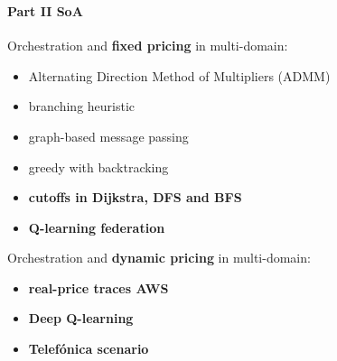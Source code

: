 \documentclass[aspectratio=169]{beamer}
\begin{document}
\begin{frame}
    \frametitle{\secname}
    \framesubtitle{Part II SoA}



    Orchestration and \textbf{fixed pricing} in multi-domain:
    \begin{itemize}
        \item Alternating Direction Method of Multipliers (ADMM)~\cite{ad3Distributed}
        \item branching heuristic~\cite{consolidation}
        \item graph-based message passing~\cite{vertex-centric}
        \item greedy with backtracking~\cite{balazsEmbedding}
        \item \textbf{\color{red}cutoffs in Dijkstra, DFS and BFS~\cite{multi-domain-msc}}
        \item \textbf{\color{red}Q-learning federation~\cite{icc}}
    \end{itemize}
    Orchestration and \textbf{\color{red}dynamic pricing} in multi-domain:
    \begin{itemize}
        \item \textbf{\color{red}real-price traces AWS}
        \item \textbf{\color{red}Deep Q-learning}
        \item \textbf{\color{red}Telefónica scenario}
    \end{itemize}
\end{frame}
\end{document}
